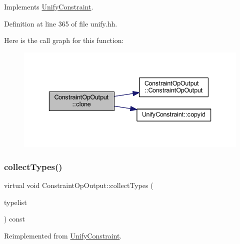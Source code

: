 Implements \mbox{\hyperlink{class_unify_constraint_a4f068343932637d355644bb21559aa12}{Unify\+Constraint}}.



Definition at line 365 of file unify.\+hh.

Here is the call graph for this function\+:
\nopagebreak
\begin{figure}[H]
\begin{center}
\leavevmode
\includegraphics[width=336pt]{class_constraint_op_output_a1545d669aef376aab9cd317c19e47fb7_cgraph}
\end{center}
\end{figure}
\mbox{\label{class_constraint_op_output_ac1f237a686a53fd03a9eafc95ca9ece0}} 
\subsubsection{\texorpdfstring{collectTypes()}{collectTypes()}}
{\footnotesize\ttfamily virtual void Constraint\+Op\+Output\+::collect\+Types (\begin{DoxyParamCaption}\item[{vector$<$ \mbox{\hyperlink{class_unify_datatype}{Unify\+Datatype}} $>$ \&}]{typelist }\end{DoxyParamCaption}) const\hspace{0.3cm}{\ttfamily [virtual]}}



Reimplemented from \mbox{\hyperlink{class_unify_constraint_acb83b6bea3b21e13054e72ac9cfaba0f}{Unify\+Constraint}}.

\mbox{\label{class_constraint_op_output_a89fa1174c3aca274c05f8f623bd63367}} 
